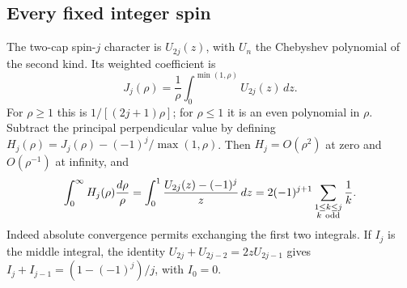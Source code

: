 \subsection{Every fixed integer spin}
The two-cap spin-$j$ character is $U_{2j}(z)$, with $U_n$ the
Chebyshev polynomial of the second kind. Its weighted coefficient is
\[
 J_j(\rho)=\frac1\rho\int_0^{\min(1,\rho)}U_{2j}(z)\,dz.
\]
For $\rho\ge1$ this is $1/[(2j+1)\rho]$; for $\rho\le1$ it is
an even polynomial in $\rho$. Subtract the principal perpendicular
value by defining
$H_j(\rho)=J_j(\rho)-(-1)^j/\max(1,\rho)$.
Then $H_j=O(\rho^2)$ at zero and $O(\rho^{-1})$ at infinity, and
\begin{equation}\label{eq:ratio-spin-integral}
 \int_0^\infty H_j(\rho)\frac{d\rho}{\rho}
 =\int_0^1\frac{U_{2j}(z)-(-1)^j}{z}\,dz
 =2(-1)^{j+1}\sum_{\substack{1\le k\le j\\k\ {\rm odd}}}\frac1k.
\end{equation}
Indeed absolute convergence permits exchanging the first two
integrals. If $I_j$ is the middle integral, the identity
$U_{2j}+U_{2j-2}=2zU_{2j-1}$ gives
$I_j+I_{j-1}=(1-(-1)^j)/j$, with $I_0=0$.

